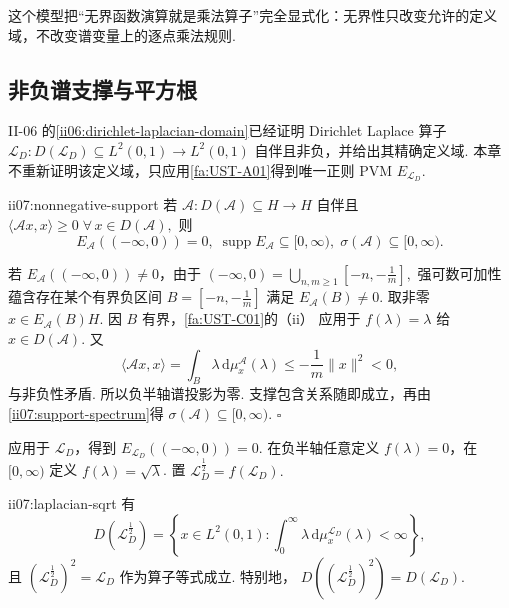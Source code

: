 这个模型把“无界函数演算就是乘法算子”完全显式化：无界性只改变允许的定义域，不改变谱变量上的逐点乘法规则.

\subsection{非负谱支撑与平方根}

II-06 的\autoref{ii06:dirichlet-laplacian-domain}已经证明 Dirichlet Laplace 算子
\(\displaystyle \mathcal L_D:D(\mathcal L_D)\subseteq L^2(0,1)\to L^2(0,1)\)
自伴且非负，并给出其精确定义域. 本章不重新证明该定义域，只应用\autoref{fa:UST-A01}得到唯一正则 PVM \(\displaystyle E_{\mathcal L_D}\).

\begin{FAProposition}[B][非负自伴算子的谱支撑非负]{ii07:nonnegative-support}
若 \(\displaystyle\mathcal A:D(\mathcal A)\subseteq H\to H\) 自伴且
\(\displaystyle \langle\mathcal Ax,x\rangle\geqslant0 \; \forall\,x\in D(\mathcal A),\)
则
\[
E_{\mathcal A}(( -\infty,0))=0,
\;
\operatorname{supp}E_{\mathcal A}\subseteq[0,\infty),
\;
\sigma(\mathcal A)\subseteq[0,\infty).
\]
\end{FAProposition}

\begin{FAProof}
若 \(\displaystyle E_{\mathcal A}(( -\infty,0))\neq0\)，由于
\(\displaystyle (-\infty,0) = \bigcup_{n,m\geqslant1}[-n,-\frac{1}{m}],\)
强可数可加性蕴含存在某个有界负区间 \(\displaystyle B=[-n,-\frac{1}{m}]\) 满足 \(\displaystyle E_{\mathcal A}(B)\neq0\). 取非零 \(\displaystyle x\in E_{\mathcal A}(B)H\). 因 \(\displaystyle B\) 有界，\autoref{fa:UST-C01}的（ii） 应用于 \(\displaystyle f(\lambda)=\lambda\) 给 \(\displaystyle x\in D(\mathcal A)\). 又
\[
\langle\mathcal Ax,x\rangle
=
\int_B\lambda\,\mathrm{d}\mu_x^{\mathcal A}(\lambda)
\leqslant
-\frac1m\|x\|^2<0,
\]
与非负性矛盾. 所以负半轴谱投影为零. 支撑包含关系随即成立，再由\autoref{ii07:support-spectrum}得 \(\displaystyle\sigma(\mathcal A)\subseteq[0,\infty)\).
\hfill\(\square\)
\end{FAProof}

应用于 \(\displaystyle\mathcal L_D\)，得到
\(\displaystyle E_{\mathcal L_D}(( -\infty,0))=0.\)
在负半轴任意定义 \(\displaystyle f(\lambda)=0\)，在 \(\displaystyle[0,\infty)\) 定义 \(\displaystyle f(\lambda)=\sqrt\lambda\). 置
\(\displaystyle \mathcal L_D^{\frac{1}{2}}=f(\mathcal L_D).\)

\begin{FAProposition}[B][谱平方根]{ii07:laplacian-sqrt}
有
\[
D(\mathcal L_D^{\frac{1}{2}})
=
\left\{
 x\in L^2(0,1):
 \int_0^\infty\lambda\,\mathrm{d}\mu_x^{\mathcal L_D}(\lambda)<\infty
\right\},
\]
且
\(\displaystyle (\mathcal L_D^{\frac{1}{2}})^2=\mathcal L_D\)
作为算子等式成立. 特别地，
\(\displaystyle D((\mathcal L_D^{\frac{1}{2}})^2)=D(\mathcal L_D).\)
\end{FAProposition}

